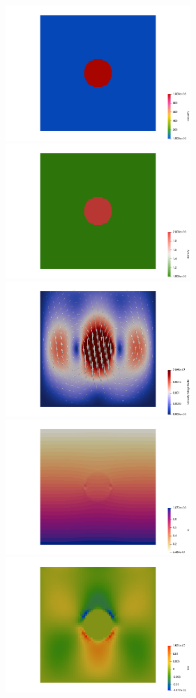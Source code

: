 \begin{center} 
\includegraphics[width=7cm]{python_codes/fieldstone_16/results/eta}
\includegraphics[width=7cm]{python_codes/fieldstone_16/results/rho}\\
\includegraphics[width=7cm]{python_codes/fieldstone_16/results/vel}
\includegraphics[width=7cm]{python_codes/fieldstone_16/results/q}\\
\includegraphics[width=7cm]{python_codes/fieldstone_16/results/exx}

\end{center}
